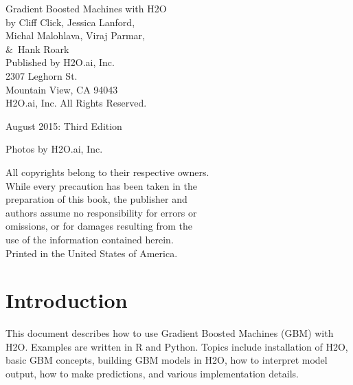 {\raggedright 

Gradient Boosted Machines with H2O\\

  by Cliff Click, Jessica Lanford, \\
Michal Malohlava, Viraj Parmar, \\
\&\  Hank Roark\\
\bigskip
  Published by H2O.ai, Inc. \\
2307 Leghorn St. \\
Mountain View, CA 94043\\
\bigskip
{} H2O.ai, Inc. All Rights Reserved. 
\bigskip

August 2015: Third Edition
\bigskip

Photos by \textcopyright H2O.ai, Inc.
\bigskip

All copyrights belong to their respective owners.\\
While every precaution has been taken in the\\
preparation of this book, the publisher and\\
authors assume no responsibility for errors or\\
omissions, or for damages resulting from the\\
use of the information contained herein.\\
\bigskip
Printed in the United States of America. 
}


\newpage
\thispagestyle{empty}%

\tableofcontents


\newpage

\section{Introduction}
This document describes how to use Gradient Boosted Machines (GBM) with H2O.  
Examples are written in R and Python.
Topics include installation of H2O, basic GBM concepts, building GBM models in H2O, how to
interpret model output, how to make predictions, and various implementation details.




